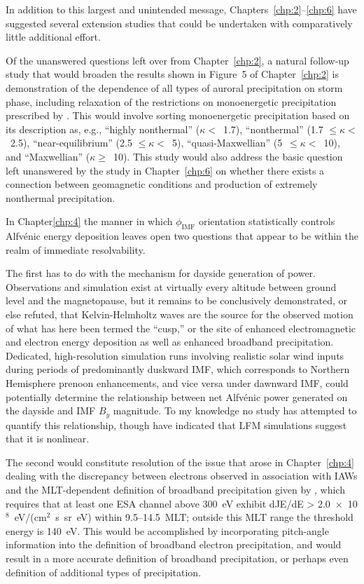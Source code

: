   In addition to this largest and unintended message,
  Chapters~\ref{chp:2}--\ref{chp:6} have suggested several extension
  studies that could be undertaken with comparatively little
  additional effort.

  Of the unanswered questions left over from Chapter~\ref{chp:2}, a
  natural follow-up study that would broaden the results shown in
  Figure~5 of Chapter~\ref{chp:2} is demonstration of the dependence
  of all types of auroral precipitation on storm phase, including
  relaxation of the restrictions on monoenergetic precipitation
  prescribed by \citet{McIntosh2014}. This would involve sorting
  monoenergetic precipitation based on its description as, e.g.,
  ``highly nonthermal'' ($\kappa <$~1.7), ``nonthermal'' (1.7 $\leq
  \kappa <$~2.5), ``near-equilibrium'' (2.5 $\leq \kappa <$~5),
  ``quasi-Maxwellian'' (5~$\leq \kappa <$~10), and ``Maxwellian''
  ($\kappa \geq$~10). This study would also address the basic question
  left unanswered by the study in Chapter~\ref{chp:6} on whether there
  exists a connection between geomagnetic conditions and production of
  extremely nonthermal precipitation.

  In Chapter\ref{chp:4} the manner in which $\phi_{\textrm{IMF}}$
  orientation statistically controls Alfv\'{e}nic energy deposition
  leaves open two questions that appear to be within the realm of
  immediate resolvability.

  The first has to do with the mechanism for dayside generation of
  \Alfic power. Observations and simulation exist at virtually every
  altitude between ground level and the magnetopause, but it remains
  to be conclusively demonstrated, or else refuted, that
  Kelvin-Helmholtz waves are the source for the observed motion of
  what has here been termed the ``\Alfic cusp,'' or the site of
  enhanced \Alfic electromagnetic and electron energy deposition as
  well as enhanced broadband precipitation. Dedicated, high-resolution
  simulation runs involving realistic solar wind inputs during periods
  of predominantly duskward IMF, which corresponds to Northern
  Hemisphere prenoon \Alfic enhancements, and vice versa under
  dawnward IMF, could potentially determine the relationship between
  net Alfv\'{e}nic power generated on the dayside and IMF $B_y$
  magnitude. To my knowledge no study has attempted to quantify this
  relationship, though \citet{Zhang2014} have indicated that LFM
  simulations suggest that it is nonlinear.

  The second would constitute resolution of the issue that arose in
  Chapter~\ref{chp:4} dealing with the discrepancy between electrons
  observed in association with IAWs and the MLT-dependent definition
  of broadband precipitation given by \citet{Newell2009}, which
  requires that at least one ESA channel above 300~eV exhibit dJE/dE >
  2.0~$\times$~10$^8$~eV/(cm$^2$~s~sr~eV) within 9.5--14.5~MLT;
  outside this MLT range the threshold energy is 140~eV. This would be
  accomplished by incorporating pitch-angle information into the
  definition of broadband electron precipitation, and would result in
  a more accurate definition of broadband precipitation, or perhaps
  even definition of additional types of precipitation.

